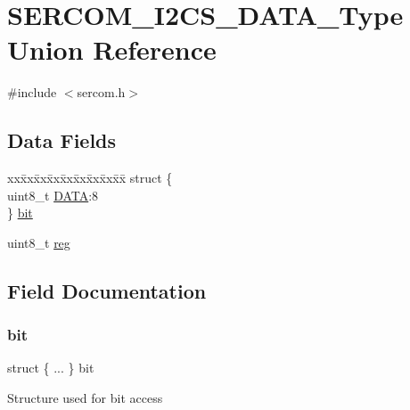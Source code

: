 \hypertarget{union_s_e_r_c_o_m___i2_c_s___d_a_t_a___type}{}\section{S\+E\+R\+C\+O\+M\+\_\+\+I2\+C\+S\+\_\+\+D\+A\+T\+A\+\_\+\+Type Union Reference}
\label{union_s_e_r_c_o_m___i2_c_s___d_a_t_a___type}


{\ttfamily \#include $<$sercom.\+h$>$}

\subsection*{Data Fields}
\begin{DoxyCompactItemize}
\item 
\begin{tabbing}
xx\=xx\=xx\=xx\=xx\=xx\=xx\=xx\=xx\=\kill
struct \{\\
\>uint8\_t \mbox{\hyperlink{union_s_e_r_c_o_m___i2_c_s___d_a_t_a___type_a16a414d747fa31fade2c82eb140875e1}{DATA}}:8\\
\} \mbox{\hyperlink{union_s_e_r_c_o_m___i2_c_s___d_a_t_a___type_a7860e373eb83537794ab0680361ae3e9}{bit}}\\

\end{tabbing}\item 
uint8\+\_\+t \mbox{\hyperlink{union_s_e_r_c_o_m___i2_c_s___d_a_t_a___type_a9428adc9af4653a2050e2536b55dec8d}{reg}}
\end{DoxyCompactItemize}


\subsection{Field Documentation}
\mbox{\label{union_s_e_r_c_o_m___i2_c_s___d_a_t_a___type_a7860e373eb83537794ab0680361ae3e9}} 
\subsubsection{\texorpdfstring{bit}{bit}}
{\footnotesize\ttfamily struct \{ ... \}   bit}

Structure used for bit access \mbox{\label{union_s_e_r_c_o_m___i2_c_s___d_a_t_a___type_a16a414d747fa31fade2c82eb140875e1}} 
